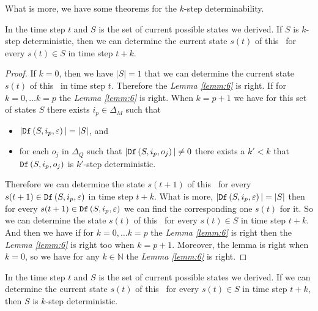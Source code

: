 What is more, we have some theorems for the $k$-step determinability.
\begin{lemma}
 In the time step $t$ and $S$ is the set of current possible states we derived. If $S$ is $k$-step deterministic, then we can determine the current state $s(t)$ of this \BCN\ for every $s(t)\in S$ in time step $t+k$.
  \label{lemm:6}
\end{lemma}
\begin{proof} If $k=0$, then we have $|S|=1$ that we can determine the current state $s(t)$ of this \BCN\ in time step $t$. Therefore the {\em Lemma \ref{lemm:6}} is right. If for $k=0,\ldots k=p$ the {\em Lemma \ref{lemm:6}} is right. When $k=p+1$ we have for this set of states $S$ there exists $i_p \in \Delta_M$ such that
 \begin{itemize}
 \item  $|{\tt Df}\left(S,i_p,\varepsilon\right)|=|S|$, and 
 \item  for each $o_j$ in $\Delta_Q$ such that $|{\tt Df}\left(S,i_p,o_j\right)|\neq 0$ there exists a ${k'}<k$ that ${\tt Df}\left(S,i_p,o_j\right)$ is $k'$-step deterministic.
 \end{itemize}
 Therefore we can determine the state $s(t+1)$ of this \BCN\ for every $s(t+1)\in {\tt Df}\left(S,i_p,\varepsilon\right)$ in time step $t+k$. What is more, $|{\tt Df}\left(S,i_p,\varepsilon\right)|=|S|$ then for every $s(t+1)\in {\tt Df}\left(S,i_p,\varepsilon\right)$ we can find the corresponding one $s(t)$ for it. So we can determine the state $s(t)$ of this \BCN\ for every $s(t)\in S$ in time step $t+k$. And then we have if for $k=0,\ldots k=p$ the {\em Lemma \ref{lemm:6}} is right then the {\em Lemma \ref{lemm:6}} is right too when $k=p+1$. Moreover, the lemma is right when $k=0$, so we have for any $k\in \mathbb{N}$ the {\em Lemma \ref{lemm:6}} is right.
\end{proof}
\begin{lemma}
 In the time step $t$ and $S$ is the set of current possible states we derived. If we can determine the current state $s(t)$ of this \BCN\ for every $s(t)\in S$ in time step $t+k$, then $S$ is $k$-step deterministic.
  \label{lemm:7}
\end{lemma}

